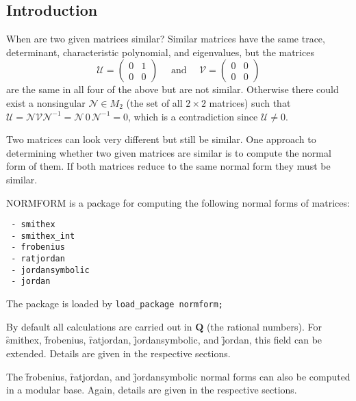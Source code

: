 
\subsection{Introduction}
\ifdefined{}\else
\newcommand{\rank}{\mathop{\mathrm{rank}}}
\fi
When are two given matrices similar? Similar matrices have the same
trace, determinant, characteristic polynomial,
and eigenvalues, but the matrices
\[
 \mathcal{U} = \begin{pmatrix} 0 & 1 \\ 0 & 0 \end{pmatrix}
  \quad\text{ and } \quad
 \mathcal{V} = \begin{pmatrix} 0 & 0 \\ 0 & 0 \end{pmatrix}
\]
are the same in all four of the above but are not similar. Otherwise
there could exist a nonsingular $\mathcal{ N} {\in} M_{2}$ (the set of
all $2 \times 2$ matrices) such that $\mathcal{U} = \mathcal{N} \mathcal{V}
\mathcal{N}^{-1} = \mathcal{N} \, \mathit{0} \, \mathcal{N}^{-1} = \mathit{0}$,
which is a contradiction since $\mathcal{U} \neq \mathit{0}$.

Two matrices can look very different but still be similar. One
approach to determining whether two given matrices are similar is to
compute the normal form of them. If both matrices reduce to the same
normal form they must be similar.

{\small NORMFORM} is a package for computing the following normal
forms of matrices:

\begin{verbatim}
 - smithex
 - smithex_int
 - frobenius
 - ratjordan
 - jordansymbolic
 - jordan
\end{verbatim}

The package is loaded by \texttt{load\_package normform;}

By default all calculations are carried out in $\mathbf{Q}$ (the rational
numbers). For \f{smithex}, \f{frobenius}, \f{ratjordan},
\f{jordansymbolic}, and \f{jordan}, this field can be extended.
Details are given in the respective sections.

The \f{frobenius}, \f{ratjordan}, and \f{jordansymbolic} normal
forms can also be computed in a modular base. Again, details are given
in the respective sections.

